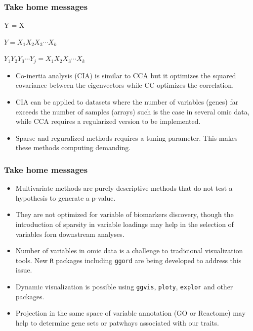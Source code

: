 \documentclass[10pt,xcolor=dvipsnames]{beamer}\usepackage[]{graphicx}\usepackage[]{color}
\begin{document}
\begin{frame}\frametitle{Take home messages}

\begin{description}[labelwidth=\widthof{\textbf{Canonical correlation}}]
 \item[Correlation] Y = X
 \item[Multiple correlation] $Y = X_1 X_2 X_3 \cdots X_k$
 \item[Canonical correlation] $Y_1 Y_2 Y_3 \cdots Y_j = X_1 X_2 X_3 \cdots X_k$
\end{description}

\begin{itemize}
  \item Co-inertia analysis (CIA) is similar to CCA but it optimizes the squared covariance between the eigenvectors while CC optimizes
        the correlation. 
  \item CIA can be applied to datasets where the number of variables (genes) far exceeds the number of samples (arrays) such is the case in several omic data, while CCA requires a regularized version to be implemented. 
  \item Sparse and reguralized methods requires a tuning parameter. This makes these methods computing demanding.
\end{itemize}


\end{frame}



\begin{frame}\frametitle{Take home messages}
\begin{itemize}
  \item Multivariate methods are purely descriptive methods that do not test a hypothesis to generate a p-value.
  \item They are not optimized for variable of biomarkers discovery, though the introduction of sparsity in variable loadings may help in the selection of variables forn downstream analyses.
  \item Number of variables in omic data is a challenge to tradicional visualization tools. New {\tt R} packages including {\tt ggord} are being developed to address this issue.
  \item Dynamic visualization is possible using {\tt ggvis}, {\tt ploty}, {\tt explor} and other packages.
  \item Projection in the same space of variable annotation (GO or Reactome) may help to determine gene sets or patwhays associated with our traits.

\end{itemize}
\end{frame}
\end{document}
